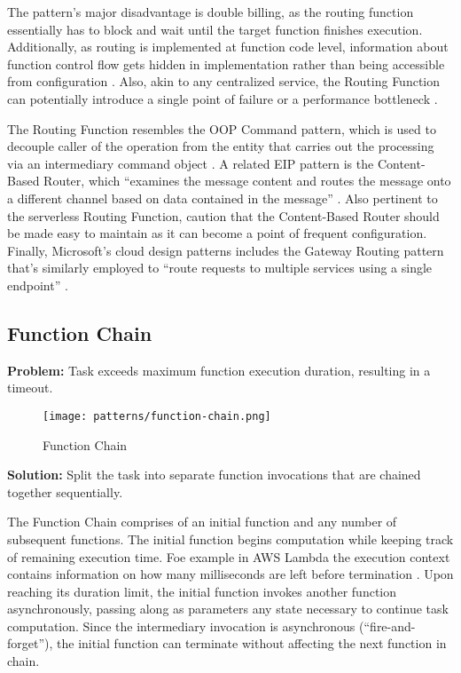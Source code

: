 The pattern's major disadvantage is double billing, as the routing function essentially has to block and wait until the target function finishes execution. Additionally, as routing is implemented at function code level, information about function control flow gets hidden in implementation rather than being accessible from configuration \parencite{leitner18industrialpractice}. Also, akin to any centralized service, the Routing Function can potentially introduce a single point of failure or a performance bottleneck \parencite{microsoft18cloudPatterns}.

The Routing Function resembles the OOP Command pattern, which is used to decouple caller of the operation from the entity that carries out the processing via an intermediary command object \parencite{gamma94designPatterns}. A related EIP pattern is the Content-Based Router, which ``examines the message content and routes the message onto a different channel based on data contained in the message'' \parencite{hohpe2004enterprise}. Also pertinent to the serverless Routing Function, \textcite{hohpe2004enterprise} caution that the Content-Based Router should be made easy to maintain as it can become a point of frequent configuration. Finally, Microsoft's cloud design patterns includes the Gateway Routing pattern that's similarly employed to ``route requests to multiple services using a single endpoint'' \parencite{microsoft18cloudPatterns}.

\subsection{Function Chain} \label{subsec:functionChain}

\textbf{Problem:} Task exceeds maximum function execution duration, resulting in a timeout.

\begin{figure}[h]
  \centering
  \texttt{[image: patterns/function-chain.png]}
  \caption{Function Chain}
  \label{fig:patternFunctionChain}
\end{figure}

\textbf{Solution:} Split the task into separate function invocations that are chained together sequentially.

The Function Chain comprises of an initial function and any number of subsequent functions. The initial function begins computation while keeping track of remaining execution time. Foe example in AWS Lambda the execution context contains information on how many milliseconds are left before termination \parencite{awslambda0218}. Upon reaching its duration limit, the initial function invokes another function asynchronously, passing along as parameters any state necessary to continue task computation. Since the intermediary invocation is asynchronous (``fire-and-forget''), the initial function can terminate without affecting the next function in chain.

